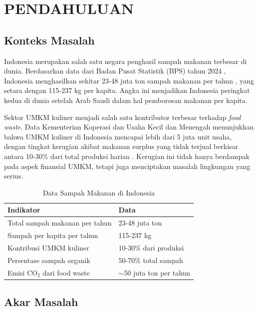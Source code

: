 \section{PENDAHULUAN}

\subsection{Konteks Masalah}

Indonesia merupakan salah satu negara penghasil sampah makanan terbesar di dunia. Berdasarkan data dari Badan Pusat Statistik (BPS) tahun 2024 \cite{bps2024lingkungan}, Indonesia menghasilkan sekitar 23-48 juta ton sampah makanan per tahun \cite{indonesiapolicy2025}, yang setara dengan 115-237 kg per kapita. Angka ini menjadikan Indonesia peringkat kedua di dunia setelah Arab Saudi dalam hal pemborosan makanan per kapita.

Sektor UMKM kuliner menjadi salah satu kontributor terbesar terhadap \textit{food waste}. Data Kementerian Koperasi dan Usaha Kecil dan Menengah \cite{kemenkopukm2024} menunjukkan bahwa UMKM kuliner di Indonesia mencapai lebih dari 5 juta unit usaha, dengan tingkat kerugian akibat makanan surplus yang tidak terjual berkisar antara 10-30\% dari total produksi harian \cite{donatfitri2026}. Kerugian ini tidak hanya berdampak pada aspek finansial UMKM, tetapi juga menciptakan masalah lingkungan yang serius.

\begin{table}[htbp]
\centering
\caption{Data Sampah Makanan di Indonesia}
\label{tab:data_sampah}
\begin{tabularx}{\textwidth}{|l|X|}
\hline
\textbf{Indikator} & \textbf{Data} \\
\hline
Total sampah makanan per tahun & 23-48 juta ton \\
\hline
Sampah per kapita per tahun & 115-237 kg \\
\hline
Kontribusi UMKM kuliner & 10-30\% dari produksi \\
\hline
Persentase sampah organik & 50-70\% total sampah \\
\hline
Emisi CO$_2$ dari food waste & $\sim$50 juta ton per tahun \\
\hline
\end{tabularx}
\end{table}

\subsection{Akar Masalah}

